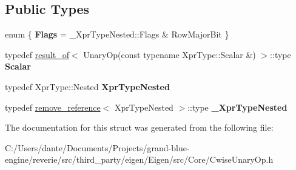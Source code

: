 \subsection*{Public Types}
\begin{DoxyCompactItemize}
\item 
\mbox{\label{struct_eigen_1_1internal_1_1traits_3_01_cwise_unary_op_3_01_unary_op_00_01_xpr_type_01_4_01_4_a539cc945fdb63334b262c043b2360870}} 
enum \{ {\bfseries Flags} = \+\_\+\+Xpr\+Type\+Nested\+::Flags \& Row\+Major\+Bit
 \}
\item 
\mbox{\label{struct_eigen_1_1internal_1_1traits_3_01_cwise_unary_op_3_01_unary_op_00_01_xpr_type_01_4_01_4_a8792be47823e42c6b98e1c273f5c41c9}} 
typedef \mbox{\hyperlink{struct_eigen_1_1internal_1_1result__of}{result\+\_\+of}}$<$ Unary\+Op(const typename Xpr\+Type\+::\+Scalar \&) $>$\+::type {\bfseries Scalar}
\item 
\mbox{\label{struct_eigen_1_1internal_1_1traits_3_01_cwise_unary_op_3_01_unary_op_00_01_xpr_type_01_4_01_4_a2f68010027de6207c504d0c746f79c17}} 
typedef Xpr\+Type\+::\+Nested {\bfseries Xpr\+Type\+Nested}
\item 
\mbox{\label{struct_eigen_1_1internal_1_1traits_3_01_cwise_unary_op_3_01_unary_op_00_01_xpr_type_01_4_01_4_a0dab38d6ea8d87fa71fc30c858034b02}} 
typedef \mbox{\hyperlink{struct_eigen_1_1internal_1_1remove__reference}{remove\+\_\+reference}}$<$ Xpr\+Type\+Nested $>$\+::type {\bfseries \+\_\+\+Xpr\+Type\+Nested}
\end{DoxyCompactItemize}


The documentation for this struct was generated from the following file\+:\begin{DoxyCompactItemize}
\item 
C\+:/\+Users/dante/\+Documents/\+Projects/grand-\/blue-\/engine/reverie/src/third\+\_\+party/eigen/\+Eigen/src/\+Core/Cwise\+Unary\+Op.\+h\end{DoxyCompactItemize}
